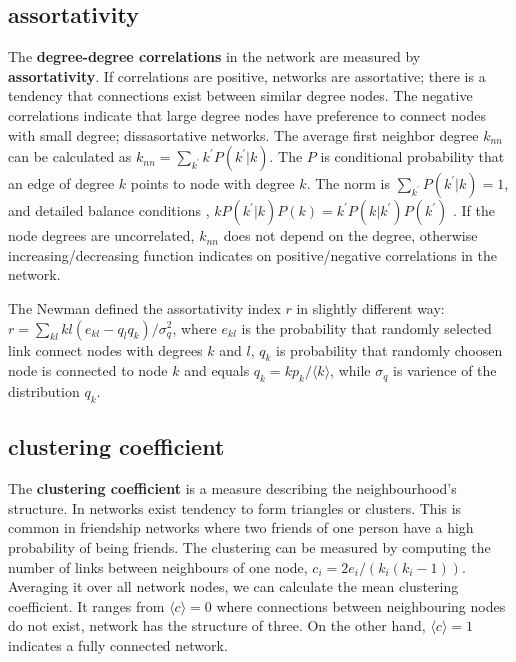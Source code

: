 \subsection{assortativity}
The \textbf{degree-degree correlations} in the network are measured by \textbf{assortativity}. If correlations are positive, networks are assortative; there is a tendency that connections exist between similar degree nodes. The negative correlations indicate that large degree nodes have preference to connect nodes with small degree; dissasortative networks. The average first neighbor degree $k_{nn}$ can be calculated as $k_{nn} = \sum_{k^{'}}k^{'}P(k^{'}|{k})$. The $P$ is conditional probability that an edge of degree $k$ points to node with degree $k$. The norm is $\sum_{k^{'}}P(k^{'}|k)=1$, and detailed balance conditions \cite{boccaletti2006},  $kP(k^{'}|k)P(k) = k^{'}P(k|k^{'})P(k^{'})$ \cite{boccaletti2006}. If the node degrees are uncorrelated, $k_{nn}$ does not depend on the degree, otherwise increasing/decreasing function indicates on positive/negative correlations in the network.

The Newman defined the assortativity index $r$ in slightly different way:
$r = \sum_{kl}kl(e_{kl} - q_lq_k) / \sigma_q^2$, where $e_{kl}$ is the probability that randomly selected link connect nodes with degrees $k$ and $l$, $q_k$ is probability that randomly choosen node is connected to node $k$ and equals $q_k = kp_k / \langle k \rangle$, while $\sigma_q$ is varience of the distribution $q_k$. 

\subsection{clustering coefficient}
The \textbf{clustering coefficient} is a measure describing the neighbourhood's structure. In networks exist tendency to form triangles or clusters. This is common in friendship networks where two friends of one person have a high probability of being friends. The clustering can be measured by computing the number of links between neighbours of one node, $c_i=2e_i/(k_i(k_i-1))$. Averaging it over all network nodes, we can calculate the mean clustering coefficient. It ranges from  $\langle c \rangle = 0$ where connections between neighbouring nodes do not exist, network has the structure of three. On the other hand, $\langle c \rangle = 1$ indicates a fully connected network. 

